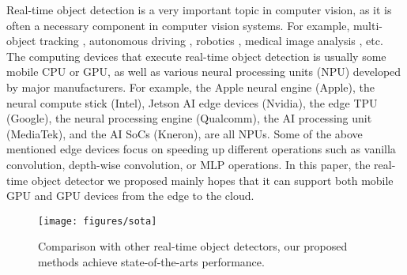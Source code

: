 \documentclass[10pt,twocolumn,letterpaper]{article}
\begin{document}
		Real-time object detection is a very important topic in computer vision, as it is often a necessary component in computer vision systems. For example, multi-object tracking \cite{zhang2021fairmot, zhang2021bytetrack}, autonomous driving \cite{li2019gs3d, feng2020deep}, robotics \cite{karaoguz2019object, paul2021object}, medical image analysis \cite{jaeger2020retina, li2019clu}, etc. The computing devices that execute real-time object detection is usually some mobile CPU or GPU, as well as various neural processing units (NPU) developed by major manufacturers. For example, the Apple neural engine (Apple), the neural compute stick (Intel), Jetson AI edge devices (Nvidia), the edge TPU (Google), the neural processing engine (Qualcomm), the AI processing unit (MediaTek), and the AI SoCs (Kneron), are all NPUs. Some of the above mentioned edge devices focus on speeding up different operations such as vanilla convolution, depth-wise convolution, or MLP operations. In this paper, the real-time object detector we proposed mainly hopes that it can support both mobile GPU and GPU devices from the edge to the cloud.
		
		\begin{figure}[t]
			\begin{center}
				\texttt{[image: figures/sota]}
			\end{center}
			\caption{Comparison with other real-time object detectors, our proposed methods achieve state-of-the-arts performance.}
			\label{fig:sota}
			\vspace{-2mm}
		\end{figure}
				
\end{document}
